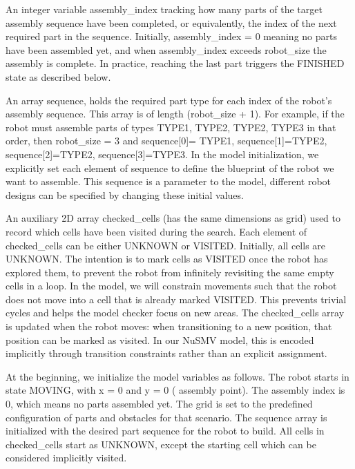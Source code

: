     An integer variable assembly\_index tracking how many parts of the target 
    assembly sequence have been completed, or equivalently, the index of 
    the next required part in the sequence. 
    Initially, assembly\_index = 0 meaning no parts have 
    been assembled yet, and when assembly\_index exceeds robot\_size 
    the assembly is complete. In practice, reaching the last part triggers 
    the FINISHED state as described below.

    An array sequence,  holds the required part type for each index of 
    the robot's assembly sequence. This array is of length (robot\_size + 1). 
    For example, if the robot must assemble parts of types TYPE1, TYPE2,
    TYPE2, TYPE3 in that order, then robot\_size = 3 and sequence[0]=
    TYPE1, sequence[1]=TYPE2, sequence[2]=TYPE2, sequence[3]=TYPE3. 
    In the model initialization, we explicitly set each element of sequence to 
    define the blueprint of the robot we want to assemble. This sequence is 
    a parameter to the model, different robot designs can be specified by 
    changing these initial values.

     An auxiliary 2D array  checked\_cells (has the same dimensions as grid) used 
    to record which cells have been visited during the search. Each element 
    of checked\_cells can be either UNKNOWN or VISITED. Initially, all cells 
    are UNKNOWN. The intention is to mark cells as VISITED once 
    the robot has explored them, to prevent the robot from infinitely revisiting 
    the same empty cells in a loop. In the model, we will constrain movements 
    such that the robot does not move into a cell that is already marked VISITED.
    This prevents trivial cycles and helps the model checker focus on 
    new areas. The checked\_cells array is updated when the robot moves: when 
    transitioning to a new position, that position can be marked as visited.
    In our NuSMV model, this is encoded implicitly through transition constraints 
    rather than an explicit assignment.

At the beginning, we initialize the model variables as 
follows. The robot starts in state MOVING, with x = 0 and y = 0 (
assembly point). The assembly index is 0, which means no parts assembled yet. 
The grid is set to the predefined configuration of parts and obstacles for 
that scenario. 
The sequence array is initialized with the desired part 
sequence for the robot to build. All cells in checked\_cells start as 
UNKNOWN, except the starting cell which can be considered implicitly 
visited.


